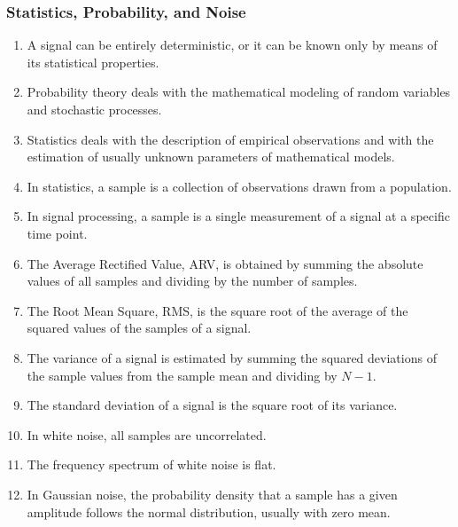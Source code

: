 \subsubsection{Statistics, Probability, and Noise}

\begin{enumerate}[label=\arabic*.]
    \item A signal can be entirely deterministic, or it can be known only by means of its statistical properties.
    
    \item Probability theory deals with the mathematical modeling of random variables and stochastic processes.
    
    \item Statistics deals with the description of empirical observations and with the estimation of usually unknown parameters of mathematical models.
    
    \item In statistics, a sample is a collection of observations drawn from a population.
    
    \item In signal processing, a sample is a single measurement of a signal at a specific time point.
    
    \item The Average Rectified Value, ARV, is obtained by summing the absolute values of all samples and dividing by the number of samples.
    
    \item The Root Mean Square, RMS, is the square root of the average of the squared values of the samples of a signal.
    
    \item The variance of a signal is estimated by summing the squared deviations of the sample values from the sample mean and dividing by $N-1$.
    
    \item The standard deviation of a signal is the square root of its variance.
    
    \item In white noise, all samples are uncorrelated.
    
    \item The frequency spectrum of white noise is flat.
    
    \item In Gaussian noise, the probability density that a sample has a given amplitude follows the normal distribution, usually with zero mean.
    

\end{enumerate}
